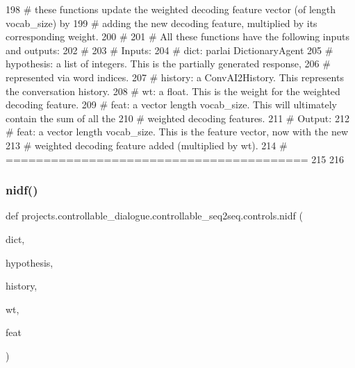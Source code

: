 \begin{DoxyCode}
198 \textcolor{comment}{# these functions update the weighted decoding feature vector (of length vocab\_size) by}
199 \textcolor{comment}{# adding the new decoding feature, multiplied by its corresponding weight.}
200 \textcolor{comment}{#}
201 \textcolor{comment}{# All these functions have the following inputs and outputs:}
202 \textcolor{comment}{#}
203 \textcolor{comment}{# Inputs:}
204 \textcolor{comment}{#   dict: parlai DictionaryAgent}
205 \textcolor{comment}{#   hypothesis: a list of integers. This is the partially generated response,}
206 \textcolor{comment}{#     represented via word indices.}
207 \textcolor{comment}{#   history: a ConvAI2History. This represents the conversation history.}
208 \textcolor{comment}{#   wt: a float. This is the weight for the weighted decoding feature.}
209 \textcolor{comment}{#   feat: a vector length vocab\_size. This will ultimately contain the sum of all the}
210 \textcolor{comment}{#     weighted decoding features.}
211 \textcolor{comment}{# Output:}
212 \textcolor{comment}{#   feat: a vector length vocab\_size. This is the feature vector, now with the new}
213 \textcolor{comment}{#     weighted decoding feature added (multiplied by wt).}
214 \textcolor{comment}{# ========================================}
215 
216 
\end{DoxyCode}
\mbox{\label{namespaceprojects_1_1controllable__dialogue_1_1controllable__seq2seq_1_1controls_a27ef93e876c9c12b265bf2eefb65f058}} 
\subsubsection{\texorpdfstring{nidf()}{nidf()}}
{\footnotesize\ttfamily def projects.\+controllable\+\_\+dialogue.\+controllable\+\_\+seq2seq.\+controls.\+nidf (\begin{DoxyParamCaption}\item[{}]{dict,  }\item[{}]{hypothesis,  }\item[{}]{history,  }\item[{}]{wt,  }\item[{}]{feat }\end{DoxyParamCaption})}

